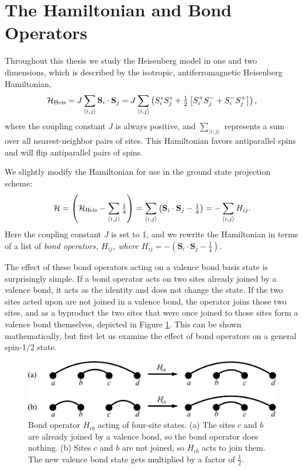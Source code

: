 \section{The Hamiltonian and Bond Operators}
Throughout this thesis we study the Heisenberg model in one and two dimensions, which is
described by the isotropic, antiferromagnetic Heisenberg Hamiltonian,
\begin{equation}
\mathcal{H}_{\rm{Heis}}=J\sum_{\langle i,j \rangle} \mathbf{S}_i\cdot \mathbf{S}_j
= J\sum_{\langle i,j \rangle}
	\left( S_i^z S_j^z + \tfrac{1}{2}\left[ S_i^+ S_j^- + S_i^- S_j^+ \right]\right),
\end{equation}
where the coupling constant $J$ is always positive, and $\sum_{\langle i,j \rangle}$ 
represents a sum over all nearest-neighbor pairs of sites.  
This Hamiltonian favors antiparallel spins and will flip antiparallel pairs of spins.

We slightly modify the Hamiltonian for use in the ground state projection scheme:
\begin{equation}
\mathcal{H}= \left(\mathcal{H}_{\rm{Heis}} - \sum_{\langle i,j \rangle} \tfrac{1}{4} \right)= \sum_{\langle i,j \rangle} 
	\left(\mathbf{S}_i\cdot \mathbf{S}_j - \tfrac{1}{4}\right)
	= - \sum_{\langle i,j \rangle} H_{ij}.
\label{hammm}
\end{equation}
Here the coupling constant $J$ is set to 1, and we rewrite the Hamiltonian in terms of a list of
\it{bond operators}, \rm $H_{ij}$, where 
$H_{ij}=-\left(\mathbf{S}_i\cdot \mathbf{S}_j - \tfrac{1}{4}\right)$.

The effect of these bond operators acting on a valence bond basis state is 
surprisingly simple.  If a bond operator acts on two sites already joined by a valence
bond, it acts as the identity and does not change the state.  If the two sites acted upon are 
not joined in a valence bond, the operator joins those two sites, and as a byproduct the 
two sites that were once joined to those sites form a valence bond themselves, depicted in Figure \ref{bopfig}.
This can be shown mathematically, but first let us examine the effect of bond operators
on a general spin-1/2 state.
\begin{figure}
\includegraphics[width=6.3in]{./figures/made/bop.pdf}
\caption[Bond operator acting of four-site states]{
	Bond operator $H_{cb}$ acting of four-site states.
	(a) The sites $c$ and $b$ are already joined by a valence bond, so the bond operator does nothing.
	(b) Sites $c$ and $b$ are not joined, so $H_{cb}$ acts to join them.  The new valence bond state gets multiplied by a factor of $\frac{1}{2}$. 
 \label{bopfig}
}
\end{figure}

